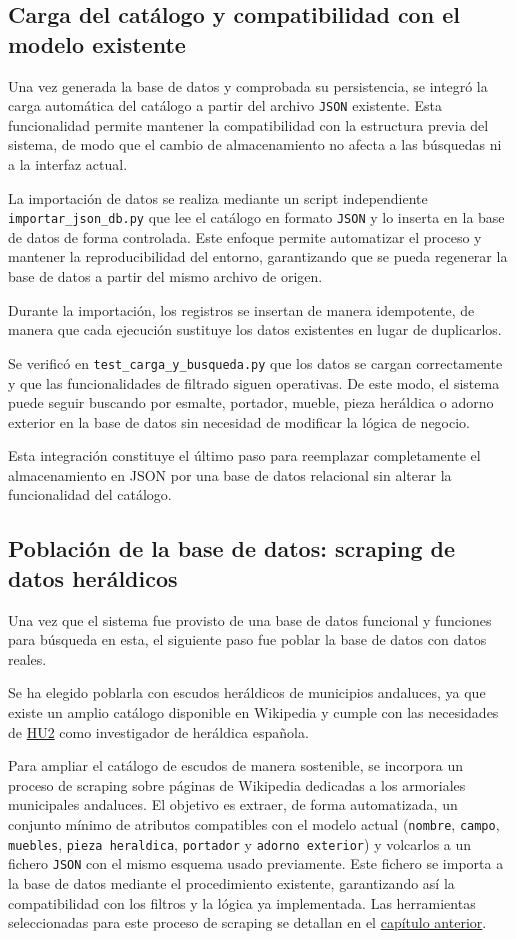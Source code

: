 \subsection{Carga del catálogo y compatibilidad con el modelo existente}
Una vez generada la base de datos y comprobada su persistencia, se integró la carga automática del catálogo a partir del 
archivo \texttt{JSON} existente. Esta funcionalidad permite mantener la compatibilidad con la estructura previa del sistema, 
de modo que el cambio de almacenamiento no afecta a las búsquedas ni a la interfaz actual.

La importación de datos se realiza mediante un script independiente \\
\texttt{importar{}\_json{}\_db.py} que lee el catálogo en formato \texttt{JSON} y lo inserta en la base de datos de forma controlada. Este enfoque permite automatizar el proceso y 
mantener la reproducibilidad del entorno, garantizando que se pueda regenerar la base de datos a partir del mismo archivo de 
origen.

Durante la importación, los registros se insertan de manera idempotente, de manera que cada ejecución sustituye los datos 
existentes en lugar de duplicarlos. 

Se verificó en \texttt{test{}\_carga{}\_y{}\_busqueda.py} que los datos se cargan correctamente y que las funcionalidades de filtrado 
siguen operativas. De este modo, el sistema puede seguir buscando por esmalte, portador, mueble, pieza heráldica o adorno 
exterior en la base de datos sin necesidad de modificar la lógica de negocio.

Esta integración constituye el último paso para reemplazar completamente el almacenamiento en JSON por una base de datos 
relacional sin alterar la funcionalidad del catálogo.

\subsection{Población de la base de datos: scraping de datos heráldicos}
Una vez que el sistema fue provisto de una base de datos funcional y funciones para búsqueda en esta, el siguiente paso 
fue poblar la base de datos con datos reales. 

Se ha elegido poblarla con escudos heráldicos de municipios andaluces, ya que existe un amplio catálogo disponible en
Wikipedia y cumple con las necesidades de \hyperref[sec:hu2]{HU2} como investigador de heráldica española.

Para ampliar el catálogo de escudos de manera sostenible, se incorpora un proceso de scraping sobre páginas de Wikipedia
dedicadas a los armoriales municipales andaluces. El objetivo es extraer, de forma automatizada, un conjunto mínimo de atributos
compatibles con el modelo actual (\texttt{nombre}, \texttt{campo}, \texttt{muebles}, \texttt{pieza heraldica}, \texttt{portador} 
y \texttt{adorno exterior}) y volcarlos a un fichero \texttt{JSON} con el mismo esquema usado previamente.  Este fichero se 
importa a la base de datos mediante el procedimiento existente, garantizando así la compatibilidad con los filtros y la lógica 
ya implementada. Las herramientas seleccionadas para este proceso de scraping se detallan en el \hyperref[sec:scraping]{capítulo anterior}.

